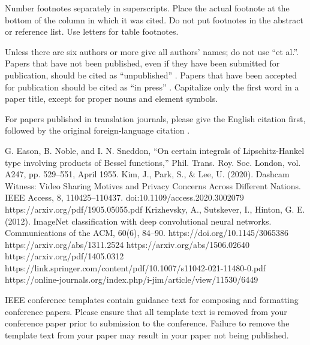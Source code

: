 \documentclass[conference]{IEEEtran}
\begin{document}
Number footnotes separately in superscripts. Place the actual footnote at 
the bottom of the column in which it was cited. Do not put footnotes in the 
abstract or reference list. Use letters for table footnotes.

Unless there are six authors or more give all authors' names; do not use 
``et al.''. Papers that have not been published, even if they have been 
submitted for publication, should be cited as ``unpublished'' \cite{b4}. Papers 
that have been accepted for publication should be cited as ``in press'' \cite{b5}. 
Capitalize only the first word in a paper title, except for proper nouns and 
element symbols.

For papers published in translation journals, please give the English 
citation first, followed by the original foreign-language citation \cite{b6}.

\begin{thebibliography}{00}
 G. Eason, B. Noble, and I. N. Sneddon, ``On certain integrals of Lipschitz-Hankel type involving products of Bessel functions,'' Phil. Trans. Roy. Soc. London, vol. A247, pp. 529--551, April 1955.
 Kim, J., Park, S., \& Lee, U. (2020). Dashcam Witness: Video Sharing Motives and Privacy Concerns Across Different Nations. IEEE Access, 8, 110425–110437. doi:10.1109/access.2020.3002079 
 https://arxiv.org/pdf/1905.05055.pdf
 Krizhevsky, A., Sutskever, I., Hinton, G. E. (2012). ImageNet classification with deep convolutional neural networks. Communications of the ACM, 60(6), 84–90. https://doi.org/10.1145/3065386
 https://arxiv.org/abs/1311.2524
 https://arxiv.org/abs/1506.02640
 https://arxiv.org/pdf/1405.0312
 https://link.springer.com/content/pdf/10.1007/s11042-021-11480-0.pdf
 https://online-journals.org/index.php/i-jim/article/view/11530/6449
\end{thebibliography}
\vspace{12pt}
\color{red}
IEEE conference templates contain guidance text for composing and formatting conference papers. Please ensure that all template text is removed from your conference paper prior to submission to the conference. Failure to remove the template text from your paper may result in your paper not being published.
\end{document}
